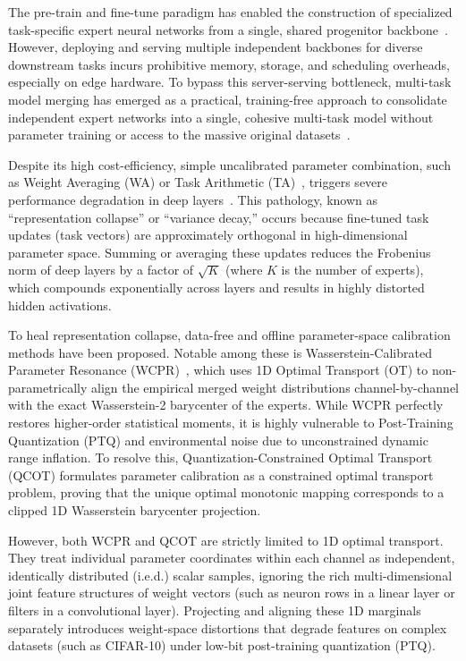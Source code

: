 \documentclass{article}
\theoremstyle{plain}
\theoremstyle{definition}
\theoremstyle{remark}
\begin{document}
The pre-train and fine-tune paradigm has enabled the construction of specialized task-specific expert neural networks from a single, shared progenitor backbone~\cite{devlin2018bert, he2016deep, vaswani2017attention}. However, deploying and serving multiple independent backbones for diverse downstream tasks incurs prohibitive memory, storage, and scheduling overheads, especially on edge hardware. To bypass this server-serving bottleneck, multi-task model merging has emerged as a practical, training-free approach to consolidate independent expert networks into a single, cohesive multi-task model without parameter training or access to the massive original datasets~\cite{wortsman2022model, ilharco2022editing}.

Despite its high cost-efficiency, simple uncalibrated parameter combination, such as Weight Averaging (WA) or Task Arithmetic (TA)~\cite{ilharco2022editing}, triggers severe performance degradation in deep layers~\cite{jordan2023repair}. This pathology, known as ``representation collapse'' or ``variance decay,'' occurs because fine-tuned task updates (task vectors) are approximately orthogonal in high-dimensional parameter space. Summing or averaging these updates reduces the Frobenius norm of deep layers by a factor of $\sqrt{K}$ (where $K$ is the number of experts), which compounds exponentially across layers and results in highly distorted hidden activations.

To heal representation collapse, data-free and offline parameter-space calibration methods have been proposed. Notable among these is Wasserstein-Calibrated Parameter Resonance (WCPR)~\cite{leclaire2024wcpr}, which uses 1D Optimal Transport (OT) to non-parametrically align the empirical merged weight distributions channel-by-channel with the exact Wasserstein-2 barycenter of the experts. While WCPR perfectly restores higher-order statistical moments, it is highly vulnerable to Post-Training Quantization (PTQ) and environmental noise due to unconstrained dynamic range inflation. To resolve this, Quantization-Constrained Optimal Transport (QCOT) formulates parameter calibration as a constrained optimal transport problem, proving that the unique optimal monotonic mapping corresponds to a clipped 1D Wasserstein barycenter projection.

However, both WCPR and QCOT are strictly limited to 1D optimal transport. They treat individual parameter coordinates within each channel as independent, identically distributed (i.e.d.) scalar samples, ignoring the rich multi-dimensional joint feature structures of weight vectors (such as neuron rows in a linear layer or filters in a convolutional layer). Projecting and aligning these 1D marginals separately introduces weight-space distortions that degrade features on complex datasets (such as CIFAR-10) under low-bit post-training quantization (PTQ). 
\end{document}
